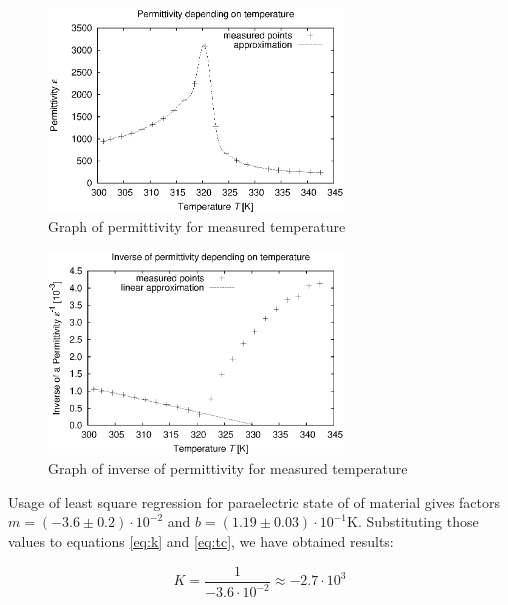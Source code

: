 \documentclass[a4paper,12pt]{article}
\begin{document}
    \begin{figure}[H]
    \begin{center}
        \includegraphics[width=0.7\textwidth]{epsilon}
        \caption{Graph of permittivity for measured temperature}
        \label{fig:epsilon}
    \end{center}
    \end{figure}

    \begin{figure}[H]
    \begin{center}
        \includegraphics[width=0.7\textwidth]{epsilon-1}
        \caption{Graph of inverse of permittivity for measured temperature}
        \label{fig:epsilon-1}
    \end{center}
    \end{figure}

    Usage of least square regression for paraelectric state of of material gives factors $m = (-3.6 \pm 0.2) \cdot 10^{-2}$ and $b = (1.19 \pm 0.03) \cdot 10^{-1} \mathrm{K}$. Substituting those values to equations \ref{eq:k} and \ref{eq:tc}, we have obtained results:

    \begin{displaymath}
        K = \frac{1}{-3.6 \cdot 10^{-2}} \approx -2.7 \cdot 10^3    
    \end{displaymath}
\end{document}
